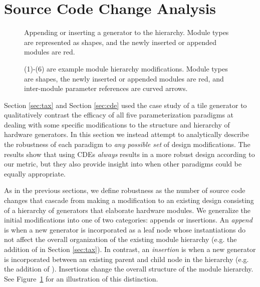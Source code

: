 \section{Source Code Change Analysis}
\label{sec:scca}

\begin{figure}[p]
\centering
{}
\caption{Appending or inserting a generator to the hierarchy.
Module types are represented as shapes, and the newly inserted or appended modules are red.}
\label{fig:both}
\end{figure}

\begin{figure}
\centering
{}
\caption{(1)-(6) are example module hierarchy modifications. 
Module types are shapes, the newly inserted or appended modules are red, and inter-module parameter references are curved arrows.}
\label{fig:attr}
\end{figure}

Section \ref{sec:tax} and Section \ref{sec:cde} used the case study of a tile generator to qualitatively contrast the efficacy of all five parameterization paradigms
at dealing with some specific modifications to the structure and hierarchy of hardware generators.
In this section we instead attempt to analytically describe the robustness of each paradigm to \textit{any possible set} of design modifications.
The results show that using CDEs \textit{always} results in a more robust design according to our metric,
but they also provide insight into when other paradigms could be equally appropriate.

As in the previous sections, we define robustness as the number of source code changes that cascade from making a modification to an existing design
consisting of a hierarchy of generators that elaborate hardware modules.
We generalize the initial modifications into one of two categories: appends or insertions.
An \emph{append} is when a new generator is incorporated as a leaf node whose instantiations do not affect the overall organization of the existing module hierarchy
(e.g. the addition of  in Section \ref{sec:tax}).
In contrast, an \emph{insertion} is when a new generator is incorporated between an existing parent and child node in the hierarchy (e.g. the addition of ). 
Insertions change the overall structure of the module hierarchy.
See Figure~\ref{fig:both} for an illustration of this distinction.

